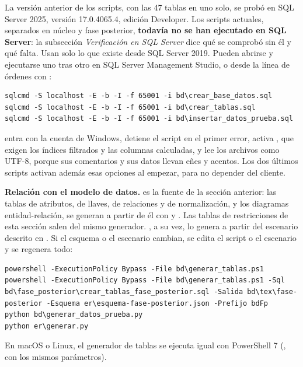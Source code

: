 La versión anterior de los scripts, con las 47 tablas en uno solo, se probó en SQL Server 2025, versión 17.0.4065.4, edición Developer. Los scripts actuales, separados en núcleo y fase posterior, \textbf{todavía no se han ejecutado en SQL Server}: la subsección \textit{Verificación en SQL Server} dice qué se comprobó sin él y qué falta. Usan solo lo que existe desde SQL Server 2019. Pueden abrirse y ejecutarse uno tras otro en SQL Server Management Studio, o desde la línea de órdenes con :

\begin{lstlisting}[style=sql]
sqlcmd -S localhost -E -b -I -f 65001 -i bd\crear_base_datos.sql
sqlcmd -S localhost -E -b -I -f 65001 -i bd\crear_tablas.sql
sqlcmd -S localhost -E -b -I -f 65001 -i bd\insertar_datos_prueba.sql
\end{lstlisting}

 entra con la cuenta de Windows,  detiene el script en el primer error,  activa , que exigen los índices filtrados y las columnas calculadas, y  lee los archivos como UTF-8, porque sus comentarios y sus datos llevan eñes y acentos. Los dos últimos scripts activan además esas opciones al empezar, para no depender del cliente.

\textbf{Relación con el modelo de datos.}  es la fuente de la sección anterior: las tablas de atributos, de llaves, de relaciones y de normalización, y los diagramas entidad-relación, se generan a partir de él con  y . Las tablas de restricciones de esta sección salen del mismo generador. , a su vez, lo genera  a partir del escenario descrito en . Si el esquema o el escenario cambian, se edita el script o el escenario y se regenera todo:

\begin{lstlisting}[style=sql]
powershell -ExecutionPolicy Bypass -File bd\generar_tablas.ps1
powershell -ExecutionPolicy Bypass -File bd\generar_tablas.ps1 -Sql bd\fase_posterior\crear_tablas_fase_posterior.sql -Salida bd\tex\fase-posterior -Esquema er\esquema-fase-posterior.json -Prefijo bdFp
python bd\generar_datos_prueba.py
python er\generar.py
\end{lstlisting}

En macOS o Linux, el generador de tablas se ejecuta igual con PowerShell 7 (, con los mismos parámetros).
